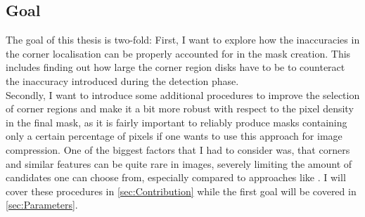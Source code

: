 \subsection*{Goal}\label{ssub:Goal}

The goal of this thesis is two-fold:
First, I want to explore how the inaccuracies in the corner localisation can be properly accounted
for in the mask creation. This includes finding out how large the corner region disks have to be to
counteract the inaccuracy introduced during the detection phase.\\
Secondly, I want to introduce some additional procedures to improve the selection of corner regions
and make it a bit more robust with respect to the pixel density in the final mask, as it is fairly
important to reliably produce masks containing only a certain percentage of pixels if one wants to
use this approach for image compression.
One of the biggest factors that I had to consider was, that corners and similar features can be quite 
rare in images, severely limiting the amount of candidates one can choose from, especially compared to
approaches like \cite{schmaltz09, hoeltgen12}. 
I will cover these procedures in \ref{sec:Contribution} while the first goal will be covered in
\ref{sec:Parameters}.
